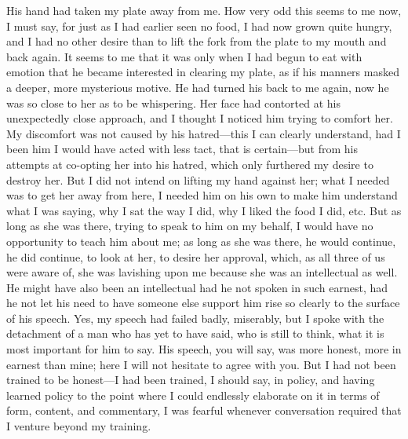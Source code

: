 \documentclass[
]{memoir}
\begin{document}
His hand had taken my plate away from me. How very odd this seems to me
now, I must say, for just as I had earlier seen no food, I had now grown
quite hungry, and I had no other desire than to lift the fork from the
plate to my mouth and back again. It seems to me that it was only when I
had begun to eat with emotion that he became interested in clearing my
plate, as if his manners masked a deeper, more mysterious motive. He had
turned his back to me again, now he was so close to her as to be
whispering. Her face had contorted at his unexpectedly close approach,
and I thought I noticed him trying to comfort her. My discomfort was not
caused by his hatred---this I can clearly understand, had I been him I
would have acted with less tact, that is certain---but from his attempts
at co-opting her into his hatred, which only furthered my desire to
destroy her. But I did not intend on lifting my hand against her; what I
needed was to get her away from here, I needed him on his own to make
him understand what I was saying, why I sat the way I did, why I liked
the food I did, etc. But as long as she was there, trying to speak to
him on my behalf, I would have no opportunity to teach him about me; as
long as she was there, he would continue, he did continue, to look at
her, to desire her approval, which, as all three of us were aware of,
she was lavishing upon me because she was an intellectual as well. He
might have also been an intellectual had he not spoken in such earnest,
had he not let his need to have someone else support him rise so clearly
to the surface of his speech. Yes, my speech had failed badly,
miserably, but I spoke with the detachment of a man who has yet to have
said, who is still to think, what it is most important for him to say.
His speech, you will say, was more honest, more in earnest than mine;
here I will not hesitate to agree with you. But I had not been trained
to be honest---I had been trained, I should say, in policy, and having
learned policy to the point where I could endlessly elaborate on it in
terms of form, content, and commentary, I was fearful whenever
conversation required that I venture beyond my training.
\end{document}
